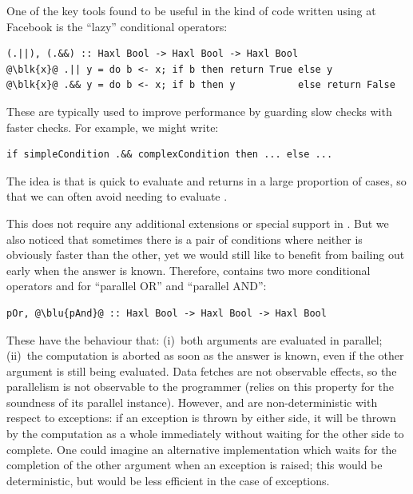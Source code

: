 One of the key tools found to be useful in the kind of code written
using \Haxl at Facebook is the ``lazy'' conditional operators:

\vspace{1mm}
\begin{verbatim}
(.||), (.&&) :: Haxl Bool -> Haxl Bool -> Haxl Bool
@\blk{x}@ .|| y = do b <- x; if b then return True else y
@\blk{x}@ .&& y = do b <- x; if b then y           else return False
\end{verbatim}
\vspace{1mm}

\noindent
These are typically used to improve performance by guarding slow
checks with faster checks.  For example, we might write:

\begin{verbatim}
if simpleCondition .&& complexCondition then ... else ...
\end{verbatim}

\noindent
The idea is that  is quick to evaluate and
returns  in a large proportion of cases, so that we can
often avoid needing to evaluate .

This does not require any additional extensions or special support in
\Haxl. But we also noticed that sometimes there is a pair of conditions
where neither is obviously faster than the other, yet we would still
like to benefit from bailing out early when the answer is known.
Therefore, \Haxl contains two more conditional operators  and
 for ``parallel OR'' and ``parallel AND'':

\begin{verbatim}
pOr, @\blu{pAnd}@ :: Haxl Bool -> Haxl Bool -> Haxl Bool
\end{verbatim}

\noindent
These have the behaviour that: (i)~both arguments are evaluated in parallel;
(ii)~the computation is aborted as soon as the answer is known, even if the
other argument is still being evaluated. Data fetches are not observable
effects, so the parallelism is not observable to the programmer (\Haxl relies
on this property for the soundness of its parallel 
instance). However,  and  are non-deterministic with
respect to exceptions: if an exception is thrown by either side, it
will be thrown by the computation as a whole immediately without
waiting for the other side to complete.  One could imagine an
alternative implementation which waits for the completion of the other
argument when an exception is raised; this would be deterministic, but
would be less efficient in the case of exceptions.

